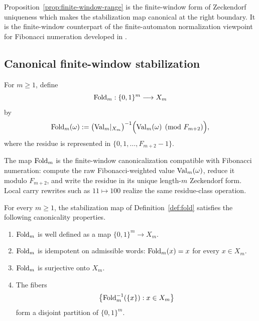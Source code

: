 \begin{remark}
Proposition~\ref{prop:finite-window-range} is the finite-window form of Zeckendorf uniqueness which makes the stabilization map canonical at the right boundary. It is the finite-window counterpart of the finite-automaton normalization viewpoint for Fibonacci numeration developed in \cite{Frougny1992,Berstel2001}.
\end{remark}

\subsection{Canonical finite-window stabilization}\label{sec:stab:fold}

\begin{definition}\label{def:fold}
For $m\ge1$, define
\[
\mathrm{Fold}_m:\{0,1\}^m\longrightarrow X_m
\]
by
\[
\mathrm{Fold}_m(\omega)
:=
\bigl(\mathrm{Val}_m|_{X_m}\bigr)^{-1}
\Bigl(\mathrm{Val}_m(\omega)\pmod {F_{m+2}}\Bigr),
\]
where the residue is represented in $\{0,1,\ldots,F_{m+2}-1\}$.
\end{definition}

\begin{remark}
The map $\mathrm{Fold}_m$ is the finite-window canonicalization compatible with Fibonacci numeration: compute the raw Fibonacci-weighted value $\mathrm{Val}_m(\omega)$, reduce it modulo $F_{m+2}$, and write the residue in its unique length-$m$ Zeckendorf form. Local carry rewrites such as $11\mapsto 100$ realize the same residue-class operation.
\end{remark}

\begin{theorem}\label{thm:fold-suite}
For every $m\ge1$, the stabilization map of Definition~\ref{def:fold}
satisfies the following canonicality properties.
\begin{enumerate}[label=(\roman*)]
  \item $\mathrm{Fold}_m$ is well defined as a map
  $\{0,1\}^m\to X_m$.
  \item $\mathrm{Fold}_m$ is idempotent on admissible words:
  $\mathrm{Fold}_m(x)=x$ for every $x\in X_m$.
  \item $\mathrm{Fold}_m$ is surjective onto $X_m$.
  \item The fibers
  \[
  \bigl\{\mathrm{Fold}_m^{-1}(\{x\}):x\in X_m\bigr\}
  \]
  form a disjoint partition of $\{0,1\}^m$.
\end{enumerate}
\end{theorem}

